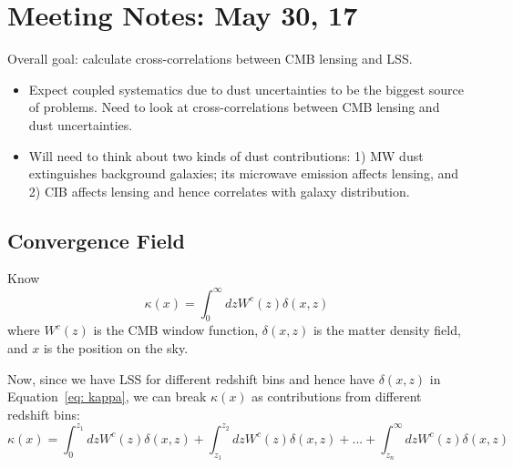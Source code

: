 \documentclass{article}
\newcommand{\eq}[1]{\begin{equation}{#1}\end{equation}}
\newcommand{\clred}[1]{\textcolor{red}{#1}}
\begin{document}
\large{
\section*{Meeting Notes: May 30, 17}
Overall goal: calculate cross-correlations between CMB lensing and LSS.
\begin{itemize}\
youitem Want $C_\ell^{\kappa\kappa}$ which probes $\sigma_8^2$; $C_\ell^{\kappa g}$ which probes $b\sigma_8^2$; $C_\ell^{gg}$ which probes $b^2\sigma_8^2$.
	\begin{itemize}
	\item Since deal with galaxies in specific redshift bins, explicitly consider auto- and cross-spectra for the bins.
	\item Say $i$th $z$-bin has central redshift $z_i$. Adopt the convention of writing the cross spectrum as $C_\ell^{\kappa i}$ which probes $b(z_i) \sigma_8^2(z_i)$ and $C_\ell^{ii}$ which probes $b^2(z_i)\sigma_8^2(z_i)$. \clred{Should $\sigma_8$ have the $z$-dependence? If yes, if/how does $z$-bin dependence come in through $C_\ell^{\kappa\kappa}$?}
          \clred{MM: $z$-dependence of $\sigma_8$ comes in through the growth factor. $P(k,z)\approx D^2(z)P(k,z_0)$ and $C_\ell^{\kappa\kappa}$ in turn depends on it through $C_\ell^{\kappa\kappa}=\int dz W^2(z) P(k=\ell/\chi,z)$}
	\end{itemize}
\item Expect coupled systematics due to dust uncertainties to be the biggest source of problems. Need to look at cross-correlations between CMB lensing and dust uncertainties.
\item Will need to think about two kinds of dust contributions: 1) MW dust extinguishes background galaxies; its microwave emission affects lensing, and 2) CIB affects lensing and hence correlates with galaxy distribution.
\end{itemize}

\subsection*{Convergence Field}
Know
\eq{\kappa(x)= \int_0^\infty dz W^c(z)\delta(x,z) \label{eq: kappa}}
where $W^c(z)$ is the CMB window function, $\delta(x,z)$ is the matter density field, and $x$ is the position on the sky.

Now, since we have LSS for different redshift bins and hence have $\delta(x, z)$ in Equation~\ref{eq: kappa}, we can break $\kappa(x)$ as contributions from different redshift bins:
\eq{\kappa(x)= \int_0^{z_1} dz W^c(z)\delta(x,z) + \int_{z_1}^{z_2} dz W^c(z)\delta(x,z) + ... + \int_{z_n}^\infty dz W^c(z)\delta(x,z) \label{eq: kappa break}}

}
\end{document}
